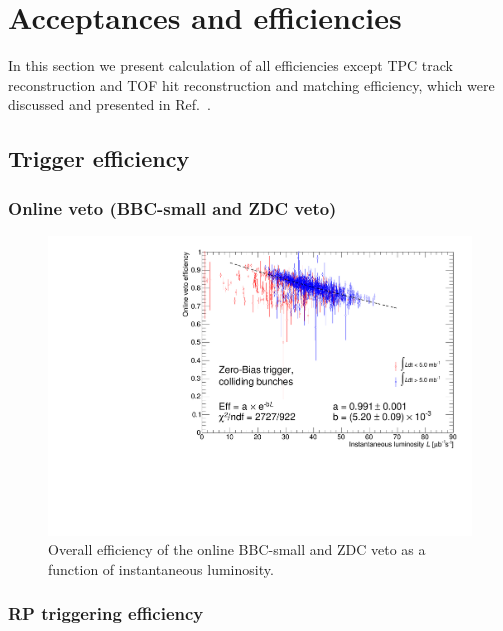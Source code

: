 \section{Acceptances and efficiencies}

In this section we present calculation of all efficiencies except TPC track reconstruction and TOF hit reconstruction and matching efficiency, which were discussed and presented in Ref.~\cite{supplementaryNote}.

\subsection{Trigger efficiency}\label{sec:triggerEff}
\subsubsection{Online veto (BBC-small and ZDC veto)}
\begin{figure}[ht!]
\centering%
\includegraphics[width=0.65\linewidth,page=1]{graphics/corrections/OnlineVetoEffVsInstLumi_graph.pdf}%
\caption{Overall efficiency of the online BBC-small and ZDC veto as a function of instantaneous luminosity.}\label{fig:onlineVetoEff}%
\end{figure}
\subsubsection{RP triggering efficiency}\label{sec:rpTrigEff}



